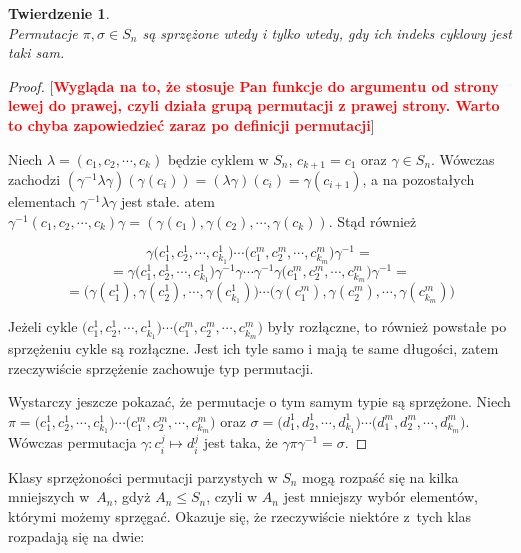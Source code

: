 \documentclass[licencjacka]{pracamgr}
\newtheorem{thh}{Twierdzenie}[section]
\begin{document}
\begin{thh} $ $ \\
    Permutacje $\pi, \sigma \in S_n$ są sprzężone wtedy i tylko wtedy, gdy ich indeks cyklowy jest taki sam.
\end{thh}
\begin{proof}

    [\textcolor{red}{\bf Wygląda na to, że stosuje Pan funkcje do argumentu od strony lewej do prawej,
    czyli działa grupą permutacji z prawej strony. Warto to chyba zapowiedzieć zaraz po definicji permutacji}]

    Niech $\lambda = (c_1, c_2, \cdots, c_k)$ będzie cyklem w $S_n$, $c_{k+1} = c_1$ oraz $\gamma \in S_n$.
    Wówczas zachodzi 
    $(\gamma^{-1} \lambda \gamma)(\gamma(c_i)) = (\lambda \gamma)(c_i) = \gamma(c_{i+1})$,
    a na pozostałych elementach $\gamma^{-1} \lambda \gamma$ jest stałe.
    atem $\gamma^{-1} (c_1, c_2, \cdots, c_k) \gamma = (\gamma(c_1), \gamma(c_2), \cdots, \gamma(c_k))$.
    Stąd również

        $$\gamma \Big(c_1^1, c_2^1, \cdots, c_{k_1}^1\Big) \cdots \Big(c_1^m, c_2^m, \cdots, c_{k_m}^m \Big) \gamma^{-1} = $$
        $$ = \gamma \Big(c_1^1, c_2^1, \cdots, c_{k_1}^1\Big) \gamma^{-1} \gamma  \cdots \gamma ^{-1} \gamma \Big(c_1^m, c_2^m, \cdots, c_{k_m}^m\Big) \gamma^{-1} = $$
        $$ = \Big(\gamma (c_1^1), \gamma (c_2^1), \cdots, \gamma (c_{k_1}^1)\Big) \cdots \Big(\gamma (c_1^m), \gamma (c_2^m), \cdots, \gamma (c_{k_m}^m)\Big)$$

    Jeżeli cykle $\Big(c_1^1, c_2^1, \cdots, c_{k_1}^1\Big) \cdots \Big(c_1^m, c_2^m, \cdots, c_{k_m}^m \Big)$ były rozłączne,
    to również powstałe po sprzężeniu cykle są rozłączne.
    Jest ich tyle samo i mają te same długości, zatem rzeczywiście sprzężenie zachowuje typ permutacji.

    Wystarczy jeszcze pokazać, że permutacje o tym samym typie są sprzężone.
    Niech $\pi =    \Big(c_1^1, c_2^1, \cdots, c_{k_1}^1\Big) \cdots \Big(c_1^m, c_2^m, \cdots, c_{k_m}^m \Big)$
    oraz  $\sigma = \Big(d_1^1, d_2^1, \cdots, d_{k_1}^1\Big) \cdots \Big(d_1^m, d_2^m, \cdots, d_{k_m}^m \Big)$.
    Wówczas permutacja $\gamma \colon c_i^j \mapsto d_i^j$ jest taka, że $\gamma \pi \gamma^{-1} = \sigma$.
\end{proof}

Klasy sprzężoności permutacji parzystych w $S_n$ mogą rozpaść się
na kilka mniejszych w~$A_n$, gdyż $A_n \le S_n$, czyli w $A_n$ jest
mniejszy wybór elementów, którymi możemy sprzęgać. Okazuje się, że
rzeczywiście niektóre z~tych klas rozpadają się na dwie:
\end{document}
